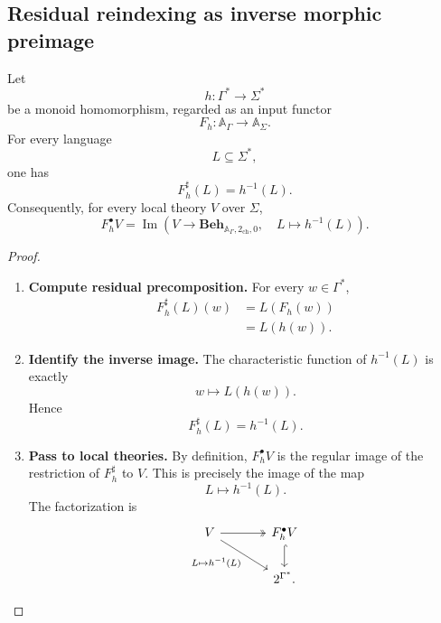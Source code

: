 \subsection{Residual reindexing as inverse morphic preimage}
\label{subsec:to-boolean-residual-reindexing}

\begin{proposition}
\label{prop:to-residual-reindexing-languages}
    Let
    \[
        h:\Gamma^*\to\Sigma^*
    \]
    be a monoid homomorphism, regarded as an input functor
    \[
        F_h:\mathbb A_\Gamma\to\mathbb A_\Sigma.
    \]
    For every language
    \[
        L\subseteq\Sigma^*,
    \]
    one has
    \[
        F_h^\sharp(L)=h^{-1}(L).
    \]
    Consequently, for every local theory \(V\) over \(\Sigma\),
    \[
        F_h^\bullet V
        =
        \operatorname{Im}
        \left(
            V\longrightarrow
            \mathbf{Beh}_{\mathbb A_\Gamma,2_{\mathrm{ch}},0},
            \quad
            L\longmapsto h^{-1}(L)
        \right).
    \]
\end{proposition}

\begin{proof}
    \leavevmode
    \begin{enumerate}
        \item \textbf{Compute residual precomposition.}
        For every \(w\in\Gamma^*\),
        \[
        \begin{aligned}
            F_h^\sharp(L)(w)
            &=
            L(F_h(w))
            \\
            &=
            L(h(w)).
        \end{aligned}
        \]

        \item \textbf{Identify the inverse image.}
        The characteristic function of \(h^{-1}(L)\) is exactly
        \[
            w\longmapsto L(h(w)).
        \]
        Hence
        \[
            F_h^\sharp(L)=h^{-1}(L).
        \]

        \item \textbf{Pass to local theories.}
        By definition, \(F_h^\bullet V\) is the regular image of the
        restriction of \(F_h^\sharp\) to \(V\). This is precisely the image of
        the map
        \[
            L\longmapsto h^{-1}(L).
        \]
        The factorization is
        \[
        \begin{tikzcd}[column sep=large]
            V
                \arrow[r, two heads]
                \arrow[dr, "{L\mapsto h^{-1}(L)}"']
            &
            F_h^\bullet V
                \arrow[d, hook]
            \\
            &
            2^{\Gamma^*}.
        \end{tikzcd}
        \]
    \end{enumerate}
\end{proof}


